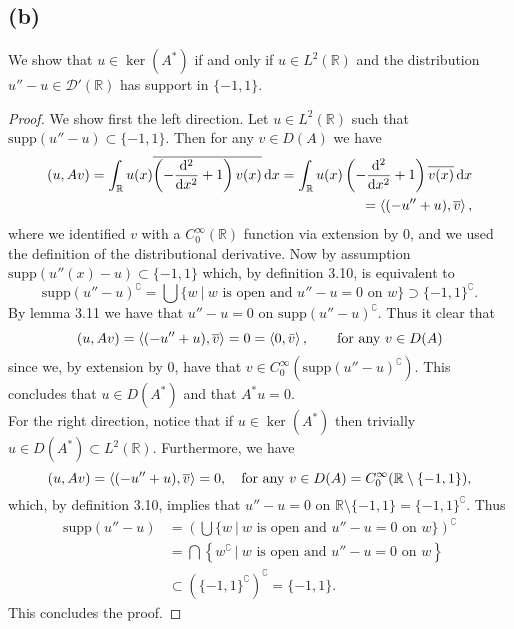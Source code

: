 \documentclass[a4paper,11pt]{article}
\newcommand{\supp}{\text{supp}}
\newcommand*\diff{\mathop{}\!\mathrm{d}}
\newcommand{\R}{\mathbb{R}}
\numberwithin{equation}{section}
\begin{document}
\subsection*{(b)}
We show that $ u\in\ker(A^*) $ if and only if $ u\in L^2(\R) $ and the distribution $ u''-u\in\mathcal{D}'(\R) $ has support in $ \{-1,1\} $.
\begin{proof}
	We show first the left direction. Let $ u\in L^2(\R) $ such that $ \supp(u''-u)\subset\{-1,1\} $. Then for any $ v\in D(A) $ we have \begin{equation}
	\begin{aligned}
	(u,Av)=\int_{\R}u(x) \overline{\left(-\frac{\diff^2}{\diff x^2}+1\right)v(x)} \diff x=\int_{\R}u(x) \left(-\frac{\diff^2}{\diff x^2}+1\right)\overline{v(x)} \diff x\\=\braket{ (-u''+u),\overline{v}},
	\end{aligned}
	\end{equation}
	where we identified $ v $ with a $ C^\infty_0(\R) $ function via extension by $ 0 $, and we used the definition of the distributional derivative.
	Now by assumption $ \supp(u''(x)-u)\subset\{-1,1\} $ which, by definition 3.10, is equivalent to $$ \supp(u''-u)^\complement=\bigcup\{w\ \vert\ w\text{ is open and }u''-u=0\text{ on }w \}\supset \{-1,1\}^\complement. $$
	By lemma 3.11 we have that $ u''-u=0 $ on $ \supp(u''-u)^\complement $.
	Thus it clear that \begin{equation}
	(u,Av)=\braket{ (-u''+u),\overline{v}}=0=\braket{0,\bar{v}}, \qquad\text{for any } v\in D(A)
	\end{equation} 
	since we, by extension by $ 0 $, have that $ v\in C^{\infty}_0\left(\supp(u''-u)^\complement\right) $. This concludes that $ u\in D(A^*) $ and that $ A^*u=0 $.\\
	For the right direction, notice that if $ u\in \ker(A^*) $ then trivially $ u\in D(A^*)\subset L^2(\R) $. Furthermore, we have \begin{equation}
	(u,Av)=\braket{ (-u''+u),\overline{v}}=0,\quad \text{for any }v\in D(A)=C_0^\infty(\R\setminus\{-1,1\}),
	\end{equation}
	which, by definition 3.10, implies that $ u''-u=0 $ on $ \R\setminus\{-1,1\}=\{-1,1\}^\complement $. Thus \begin{equation}
	\begin{aligned}
	\supp(u''-u)&=\left(\bigcup\{w\ \vert\ w\text{ is open and }u''-u=0\text{ on }w \}\right)^\complement\\&
	=\bigcap\left\{w^\complement \ \vert\ w\text{ is open and }u''-u=0\text{ on }w \right\}\\&
	\subset\left(\{-1,1\}^\complement\right)^\complement=\{-1,1\}.
	\end{aligned}
	\end{equation}
	This concludes the proof.
\end{proof}
\end{document}
